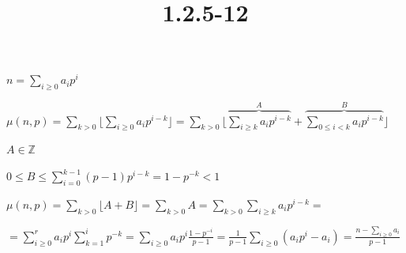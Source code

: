 \documentclass{article}
\title{1.2.5-12}
\begin{document}
\maketitle

\( n = \sum_{i \geq 0}a_ip^i \)

\( \mu(n,p) = \sum_{k > 0}{\lfloor{\sum_{i\geq 0} a_ip^{i-k}}\rfloor} = \sum_{k > 0}{\lfloor{\overbrace{\sum_{i\geq k} a_ip^{i-k}}^A + \overbrace{\sum_{0 \leq i < k} a_ip^{i-k}}^B }\rfloor} \)

\( A \in \mathbb{Z} \)

\( 0 \leq B \leq \sum_{i=0}^{k-1} (p-1)p^{i-k} = 1 - p^{-k} < 1 \)

\( \mu(n,p) = \sum_{k > 0}{\lfloor{A+B}\rfloor} = \sum_{k > 0} A = \sum_{k>0} \sum_{i \geq k} a_i p^{i-k} = \)

\( = \sum_{i \geq 0 }^r a_i p^{i} \sum_{k=1}^{i}{p^{-k}} = \sum_{i \geq 0}{a_ip^i \frac{1 - p^{-i}}{p-1}} = \frac{1}{p-1} \sum_{i\geq 0}(a_ip^i-a_i) = \frac{n - \sum_{i\geq 0}a_i}{p-1} \)
\end{document}
